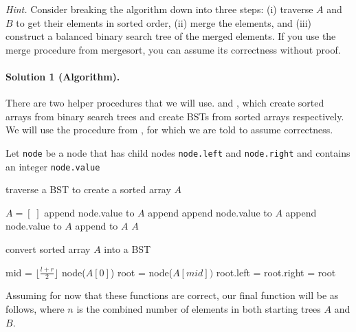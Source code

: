 \documentclass[11pt]{article}
\begin{document}
\textit{Hint.} Consider breaking the algorithm down into three steps: (i) traverse $A$ and $B$ to get their elements in sorted order, (ii) merge the elements, and (iii) construct a balanced binary search tree of the merged elements. If you use the merge procedure from mergesort, you can assume its correctness without proof.

\paragraph{Solution 1 (Algorithm).}
There are two helper procedures that we will use.  and
, which create sorted arrays from binary search trees and
create BSTs from sorted arrays respectively. We will use the 
procedure from , for which we are told to assume correctness.

Let \texttt{node} be a node that has child nodes \texttt{node.left} and \texttt{node.right} and contains an integer \texttt{node.value} 
\begin{algorithm}
\caption{traverse a BST to create a sorted array $A$}
\begin{algorithmic}[1]
\State $A = [\;]$
    \State append node.value to $A$
\Else
{}
    \State append 
    \State append node.value to $A$
\EndIf
{}
        \State append node.value to $A$
    \EndIf
    \State append  to $A$
\EndIf
\EndIf
\State \Return $A$
\EndProcedure 
\end{algorithmic}
\end{algorithm}

\begin{algorithm}
\caption{convert sorted array $A$ into a BST}
\begin{algorithmic}[1]
    \State mid = $\lfloor \frac{l+r}{2} \rfloor$
    \State \Return node($A[0]$)
    \EndIf
    \State root = node($A[mid])$
    \State root.left = 
    \State root.right = 
    \State \Return root
\EndProcedure 
\end{algorithmic}
\end{algorithm}

Assuming for now that these functions are correct, our final function
 will be as follows, where $n$ is the combined number
of elements in both starting trees $A$ and $B$.
\end{document}
